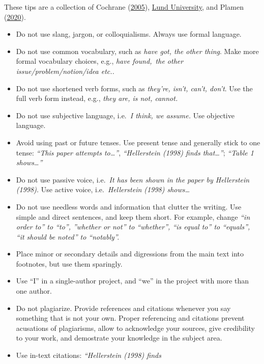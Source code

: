\documentclass[
]{book}
\providecommand{\tightlist}{%
  \setlength{\itemsep}{0pt}\setlength{\parskip}{0pt}}
\begin{document}
These tips are a collection of Cochrane
(\protect\hyperlink{ref-cochrane_writing_2005}{2005}),
\href{https://www.awelu.lu.se/language/register-and-style/dos-donts/}{Lund
University}, and Plamen
(\protect\hyperlink{ref-plamen_writing_2020}{2020}).

\begin{itemize}
\tightlist
\item
  Do not use slang, jargon, or colloquialisms. Always use formal
  language.
\item
  Do not use common vocabulary, such as \emph{have got, the other
  thing}. Make more formal vocabulary choices, e.g., \emph{have
  found,~the other issue/problem/notion/idea etc..}
\item
  Do not use shortened verb forms, such as \emph{they're, isn't, can't,
  don't}. Use the full verb form instead, e.g., \emph{they are, is not,
  cannot.}
\item
  Do not use subjective language, i.e.~\emph{I think, we assume.} Use
  objective language.
\item
  Avoid using past or future tenses. Use present tense and generally
  stick to one tense: \emph{``This paper attempts to\ldots{}''},
  \emph{``Hellerstein (1998) finds that\ldots{}''}; \emph{``Table 1
  shows\ldots{}''}
\item
  Do not use passive voice, i.e.~\emph{It has been shown in the paper by
  Hellerstein (1998).} Use active voice, i.e.~\emph{Hellerstein (1998)
  shows\ldots{}}
\item
  Do not use needless words and information that clutter the writing.
  Use simple and direct sentences, and keep them short. For example,
  change \emph{``in order to'' to ``to'', ''whether or not'' to
  ``whether'', ``is equal to'' to ``equals'', ``it should be noted'' to
  ``notably''.}
\item
  Place minor or secondary details and digressions from the main text
  into footnotes, but use them sparingly.
\item
  Use ``I'' in a single-author project, and ``we'' in the project with
  more than one author.
\item
  Do not plagiarize. Provide references and citations whenever you say
  something that is not your own. Proper referencing and citations
  prevent acusations of plagiarisms, allow to acknowledge your sources,
  give credibility to your work, and demostrate your knowledge in the
  subject area.
\item
  Use in-text citations: \emph{``Hellerstein (1998) finds
}
\end{itemize}
\end{document}
